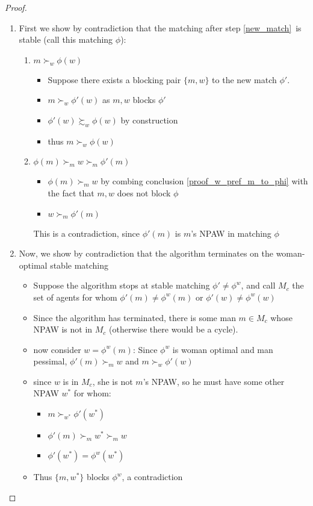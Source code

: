\documentclass[WP]{AEA}
\begin{document}
\begin{proof}
	\begin{enumerate}
		\item 	First we show by contradiction that the matching after step \ref{new_match} is stable (call this matching $\phi$):
		\begin{enumerate}
			\item \label{proof_w_pref_m_to_phi} $ m \succ_w \phi(w)$ 
			\begin{itemize}
				\item Suppose there exists a blocking pair $\{m,w\}$ to the new match $\phi '$.
				\item  $ m \succ_w \phi'(w)$ as ${m,w}$ blocks $\phi'$
				\item $ \phi'(w) \succsim_w \phi(w)$ by construction
				\item thus $ m \succ_w \phi(w)$ 
			\end{itemize}
			\item $ \phi(m) \succ_m w \succ_m \phi'(m)$
			\begin{itemize}
				\item $\phi(m) \succ_m w$  by combing   conclusion \ref{proof_w_pref_m_to_phi} with the fact that ${m,w}$ does not block $\phi$ 
				\item $w \succ_m \phi'(m)$
			\end{itemize}
		This is a contradiction, since $\phi'(m)$ is $m$'s NPAW in matching $\phi$
		\end{enumerate}	
		\item Now, we show by contradiction that the algorithm terminates on the woman-optimal stable matching
		\begin{itemize}
			\item Suppose the algorithm stops at stable matching $ \phi ' \neq \phi ^w$, and call $M_c$ the set of agents for whom $ \phi '(m) \neq \phi ^w(m)$ or $\phi'(w) \neq \phi^w(w)$
			\item Since the algorithm has terminated, there is some man $m \in M_c$ whose NPAW is not in  $M_c$ (otherwise there would be a cycle).  
			\item now consider $w = \phi^w(m)$: Since $\phi^w$ is woman optimal and man pessimal, $ \phi'(m)\succ_m w$ and $m \succ_w \phi'(w)$
			\item since $w$ is in $M_c$, she is not $m$'s NPAW, so he must have some other NPAW $w^*$ for whom:
			\begin{itemize}
				\item $m \succ_{w^*} \phi'(w^*)$
				\item $\phi'(m) \succ_m w^* \succ_m w$
				\item $\phi'(w^*) = \phi^w(w^*)$
			\end{itemize} 
			\item Thus $\{m,w^*\}$ blocks $\phi^w$, a contradiction
		\end{itemize}
	\end{enumerate}
\end{proof}
\end{document}
